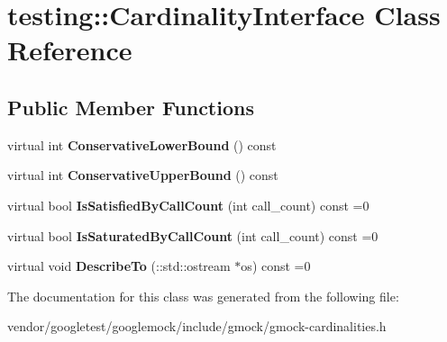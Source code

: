 \hypertarget{classtesting_1_1CardinalityInterface}{}\section{testing\+:\+:Cardinality\+Interface Class Reference}
\label{classtesting_1_1CardinalityInterface}
\subsection*{Public Member Functions}
\begin{DoxyCompactItemize}
\item 
virtual int {\bfseries Conservative\+Lower\+Bound} () const \hypertarget{classtesting_1_1CardinalityInterface_a15a7d3ba690ae8773ccd7f527fb3ce2d}{}\label{classtesting_1_1CardinalityInterface_a15a7d3ba690ae8773ccd7f527fb3ce2d}

\item 
virtual int {\bfseries Conservative\+Upper\+Bound} () const \hypertarget{classtesting_1_1CardinalityInterface_ab17c434dc9de1925ed2ae4444594032f}{}\label{classtesting_1_1CardinalityInterface_ab17c434dc9de1925ed2ae4444594032f}

\item 
virtual bool {\bfseries Is\+Satisfied\+By\+Call\+Count} (int call\+\_\+count) const =0\hypertarget{classtesting_1_1CardinalityInterface_af89684f4ea6d9de331abf7958754d8f1}{}\label{classtesting_1_1CardinalityInterface_af89684f4ea6d9de331abf7958754d8f1}

\item 
virtual bool {\bfseries Is\+Saturated\+By\+Call\+Count} (int call\+\_\+count) const =0\hypertarget{classtesting_1_1CardinalityInterface_a42508cff9627de2e6f9c1ec33a7d8bf2}{}\label{classtesting_1_1CardinalityInterface_a42508cff9627de2e6f9c1ec33a7d8bf2}

\item 
virtual void {\bfseries Describe\+To} (\+::std\+::ostream $\ast$os) const =0\hypertarget{classtesting_1_1CardinalityInterface_a8a93e3bbf24d14fe21186802ecef0929}{}\label{classtesting_1_1CardinalityInterface_a8a93e3bbf24d14fe21186802ecef0929}

\end{DoxyCompactItemize}


The documentation for this class was generated from the following file\+:\begin{DoxyCompactItemize}
\item 
vendor/googletest/googlemock/include/gmock/gmock-\/cardinalities.\+h\end{DoxyCompactItemize}
